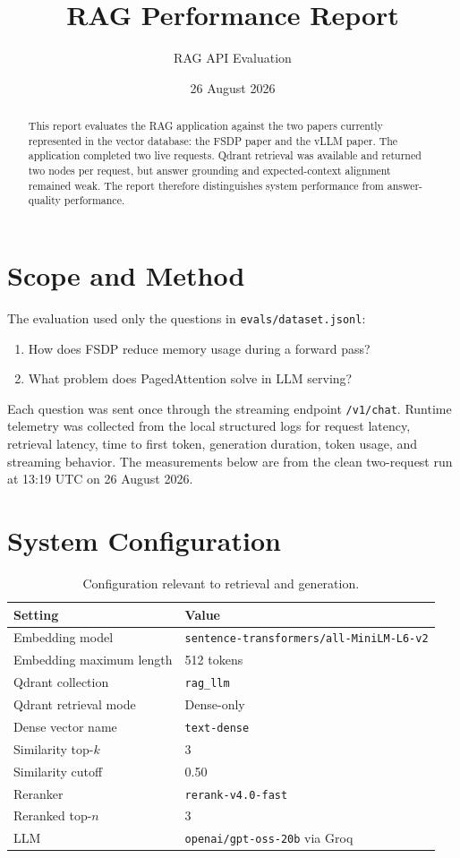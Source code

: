 \documentclass[11pt,a4paper]{article}
\title{\textbf{RAG Performance Report}}
\author{RAG API Evaluation}
\date{26 August 2026}
\begin{document}
\maketitle

\begin{abstract}
This report evaluates the RAG application against the two papers currently represented in the vector database: the FSDP paper and the vLLM paper. The application completed two live requests. Qdrant retrieval was available and returned two nodes per request, but answer grounding and expected-context alignment remained weak. The report therefore distinguishes system performance from answer-quality performance.
\end{abstract}

\section{Scope and Method}

The evaluation used only the questions in \texttt{evals/dataset.jsonl}:

\begin{enumerate}
  \item How does FSDP reduce memory usage during a forward pass?
  \item What problem does PagedAttention solve in LLM serving?
\end{enumerate}

Each question was sent once through the streaming endpoint \texttt{/v1/chat}. Runtime telemetry was collected from the local structured logs for request latency, retrieval latency, time to first token, generation duration, token usage, and streaming behavior. The measurements below are from the clean two-request run at 13:19 UTC on 26 August 2026.

\section{System Configuration}

\begin{table}[ht]
\centering
\caption{Configuration relevant to retrieval and generation.}
\begin{tabular}{ll}
\toprule
\textbf{Setting} & \textbf{Value} \\
\midrule
Embedding model & \texttt{sentence-transformers/all-MiniLM-L6-v2} \\
Embedding maximum length & 512 tokens \\
Qdrant collection & \texttt{rag\_llm} \\
Qdrant retrieval mode & Dense-only \\
Dense vector name & \texttt{text-dense} \\
Similarity top-$k$ & 3 \\
Similarity cutoff & 0.50 \\
Reranker & \texttt{rerank-v4.0-fast} \\
Reranked top-$n$ & 3 \\
LLM & \texttt{openai/gpt-oss-20b} via Groq \\
\bottomrule
\end{tabular}
\end{table}
\end{document}
